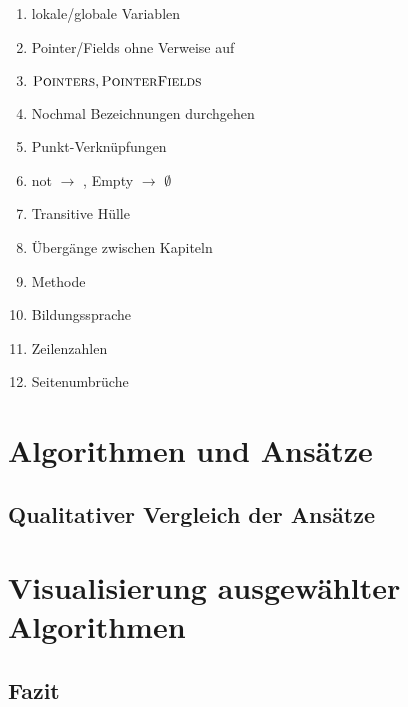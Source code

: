 
\listfiles


\listoftodos

\begin{enumerate}
	\item lokale/globale Variablen
	\item Pointer/Fields ohne Verweise auf \Roots
	\item $\textsc{Pointers}, \textsc{PointerFields}$
	\item Nochmal Bezeichnungen durchgehen
	\item Punkt-Verknüpfungen
	\item not $\rightarrow$ \NOT, Empty $\rightarrow$ $\emptyset$
	\item Transitive Hülle
	\item Übergänge zwischen Kapiteln
	\item Methode
	\item Bildungssprache
	\item Zeilenzahlen
	\item Seitenumbrüche
\end{enumerate}



\cleardoublepage

\setcounter{page}{1}
\pagestyle{maincontentstyle}


\part{Algorithmen und Ansätze}




\chapter{Qualitativer Vergleich der Ansätze}		%

\part{Visualisierung ausgewählter Algorithmen}

\cleardoublepage

\chapter{Fazit}





